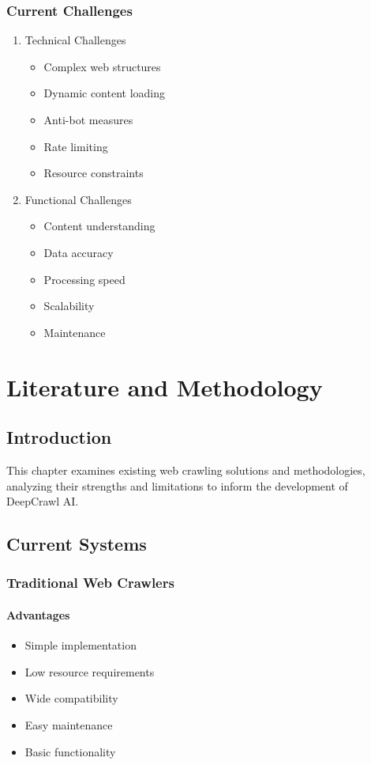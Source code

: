 \documentclass[12pt,a4paper]{report}
\begin{document}
\subsection{Current Challenges}
\begin{enumerate}
    \item Technical Challenges
    \begin{itemize}
        \item Complex web structures
        \item Dynamic content loading
        \item Anti-bot measures
        \item Rate limiting
        \item Resource constraints
    \end{itemize}
    
    \item Functional Challenges
    \begin{itemize}
        \item Content understanding
        \item Data accuracy
        \item Processing speed
        \item Scalability
        \item Maintenance
    \end{itemize}
\end{enumerate}

\chapter{Literature and Methodology}
\section{Introduction}
This chapter examines existing web crawling solutions and methodologies, analyzing their strengths and limitations to inform the development of DeepCrawl AI.

\section{Current Systems}
\subsection{Traditional Web Crawlers}
\subsubsection{Advantages}
\begin{itemize}
    \item Simple implementation
    \item Low resource requirements
    \item Wide compatibility
    \item Easy maintenance
    \item Basic functionality
\end{itemize}
\end{document}
